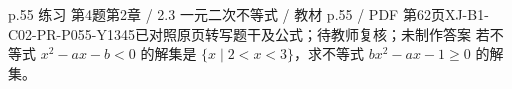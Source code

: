 \par\noindent\begin{minipage}{\linewidth}
\begin{bankitem}{p.55 练习 第4题}{第2章 / 2.3 一元二次不等式 / 教材 p.55 / PDF 第62页}{XJ-B1-C02-PR-P055-Y1345}{已对照原页转写题干及公式；待教师复核；未制作答案}
若不等式 $x^2-ax-b<0$ 的解集是 $\{x\mid2<x<3\}$，求不等式 $bx^2-ax-1\ge0$ 的解集。
\end{bankitem}
\end{minipage}\par\medskip
